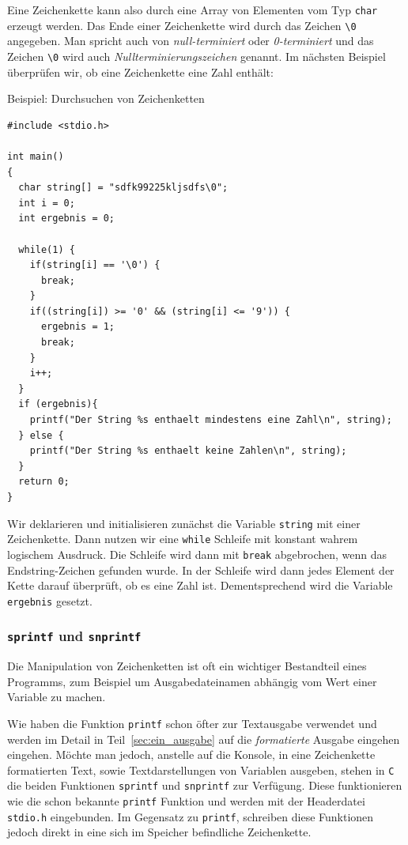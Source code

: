 Eine Zeichenkette kann also durch eine Array von Elementen vom Typ \verb|char| erzeugt werden.
Das Ende einer Zeichenkette wird durch das Zeichen \verb|\0| angegeben.
Man spricht auch von \emph{null-terminiert} oder \emph{0-terminiert} und das Zeichen \verb|\0| wird auch \emph{Nullterminierungszeichen} genannt.
Im nächsten Beispiel überprüfen wir, ob eine Zeichenkette eine Zahl enthält:
\begin{myexampleprogram}{Beispiel: Durchsuchen von Zeichenketten}
\begin{lstlisting}
#include <stdio.h>

int main()
{
  char string[] = "sdfk99225kljsdfs\0";
  int i = 0;
  int ergebnis = 0;

  while(1) {
    if(string[i] == '\0') {
      break;
    }
    if((string[i]) >= '0' && (string[i] <= '9')) {
      ergebnis = 1;
      break;
    }
    i++;
  }
  if (ergebnis){
    printf("Der String %s enthaelt mindestens eine Zahl\n", string);
  } else {
    printf("Der String %s enthaelt keine Zahlen\n", string);
  }
  return 0;
}
\end{lstlisting}
\end{myexampleprogram}
Wir deklarieren und initialisieren zunächst die Variable \texttt{string} mit einer Zeichenkette.
Dann nutzen wir eine \verb|while| Schleife mit konstant wahrem logischem Ausdruck.
Die Schleife wird dann mit \verb|break| abgebrochen, wenn das Endstring-Zeichen gefunden wurde.
In der Schleife wird dann jedes Element der Kette darauf überprüft, ob es eine Zahl ist.
Dementsprechend wird die Variable \verb|ergebnis| gesetzt.

\subsubsection{\texttt{sprintf} und \texttt{snprintf}}

Die Manipulation von Zeichenketten ist oft ein wichtiger Bestandteil eines Programms, zum Beispiel um Ausgabedateinamen abhängig vom Wert einer Variable zu machen.

Wie haben die Funktion \texttt{printf} schon öfter zur Textausgabe verwendet und werden im Detail in Teil~\ref{sec:ein_ausgabe} auf die \emph{formatierte} Ausgabe eingehen eingehen.
Möchte man jedoch, anstelle auf die Konsole, in eine Zeichenkette formatierten Text, sowie Textdarstellungen von Variablen ausgeben, stehen in \texttt{C} die beiden Funktionen \texttt{sprintf} und \texttt{snprintf} zur Verfügung.
Diese funktionieren wie die schon bekannte \texttt{printf} Funktion und werden mit der Headerdatei \texttt{stdio.h} eingebunden.
Im Gegensatz zu \texttt{printf}, schreiben diese Funktionen jedoch direkt in eine sich im Speicher befindliche Zeichenkette.

